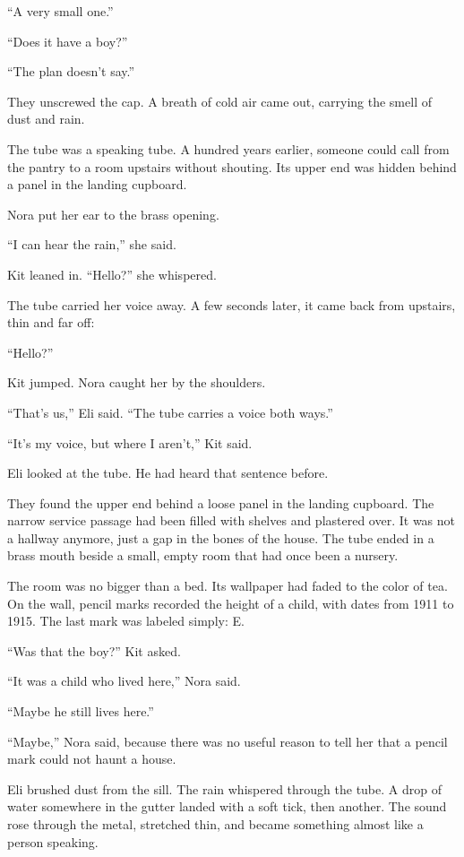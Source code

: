 \documentclass[11pt,openany]{book}
\begin{document}
``A very small one.''

``Does it have a boy?''

``The plan doesn't say.''

They unscrewed the cap. A breath of cold air came out, carrying the smell of dust and rain.

The tube was a speaking tube. A hundred years earlier, someone could call from the pantry to a room upstairs without shouting. Its upper end was hidden behind a panel in the landing cupboard.

Nora put her ear to the brass opening.

``I can hear the rain,'' she said.

Kit leaned in. ``Hello?'' she whispered.

The tube carried her voice away. A few seconds later, it came back from upstairs, thin and far off:

``Hello?''

Kit jumped. Nora caught her by the shoulders.

``That's us,'' Eli said. ``The tube carries a voice both ways.''

``It's my voice, but where I aren't,'' Kit said.

Eli looked at the tube. He had heard that sentence before.

They found the upper end behind a loose panel in the landing cupboard. The narrow service passage had been filled with shelves and plastered over. It was not a hallway anymore, just a gap in the bones of the house. The tube ended in a brass mouth beside a small, empty room that had once been a nursery.

The room was no bigger than a bed. Its wallpaper had faded to the color of tea. On the wall, pencil marks recorded the height of a child, with dates from 1911 to 1915. The last mark was labeled simply: E.

``Was that the boy?'' Kit asked.

``It was a child who lived here,'' Nora said.

``Maybe he still lives here.''

``Maybe,'' Nora said, because there was no useful reason to tell her that a pencil mark could not haunt a house.

Eli brushed dust from the sill. The rain whispered through the tube. A drop of water somewhere in the gutter landed with a soft tick, then another. The sound rose through the metal, stretched thin, and became something almost like a person speaking.
\end{document}

